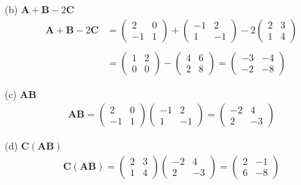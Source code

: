 \documentclass{article}
\begin{document}
\begin{enumerate}
\begin{enumerate}
            \item[(b)] $\mathbf{A} + \mathbf{B} - 2\mathbf{C}$
            \begin{align*}
                \mathbf{A} + \mathbf{B} - 2\mathbf{C} 
                &= \begin{pmatrix}2 &0\\-1 &1\end{pmatrix}
                 + \begin{pmatrix}-1 &2\\1 &-1\end{pmatrix}
                 - 2\begin{pmatrix}2 &3\\1 &4\end{pmatrix} \\
                & \\
                &= \begin{pmatrix}1 &2\\0 &0\end{pmatrix}
                 - \begin{pmatrix}4 &6\\2 &8\end{pmatrix} 
                 = \begin{pmatrix}-3 &-4\\-2 &-8\end{pmatrix} 
            \end{align*}

            \item[(c)] $\mathbf{A}\mathbf{B}$
            \begin{align*}
                \mathbf{A}\mathbf{B}
                = \begin{pmatrix}2 &0\\-1 &1\end{pmatrix}
                  \begin{pmatrix}-1 &2\\1 &-1\end{pmatrix}
                = \begin{pmatrix}-2 &4\\2 &-3\end{pmatrix}
            \end{align*}
            
            \item[(d)] $\mathbf{C}(\mathbf{A}\mathbf{B})$
            \begin{align*}
                \mathbf{C}(\mathbf{A}\mathbf{B})
                = \begin{pmatrix}2 &3\\1 &4\end{pmatrix}
                  \begin{pmatrix}-2 &4\\2 &-3\end{pmatrix}
                = \begin{pmatrix}2 &-1\\6 &-8\end{pmatrix}
            \end{align*}
            

\end{enumerate}
\end{enumerate}
\end{document}
